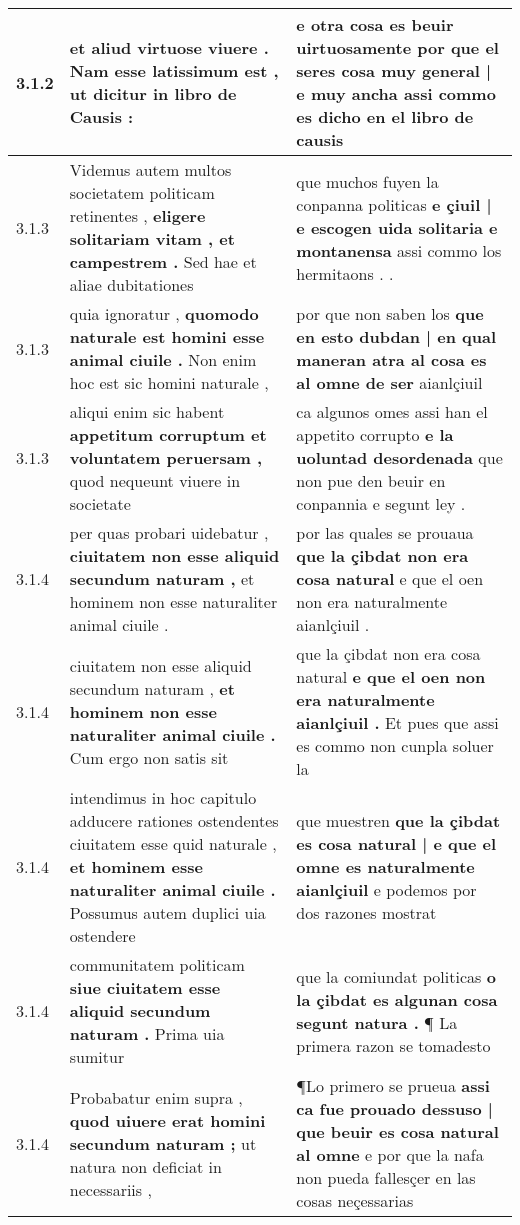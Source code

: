 \begin{tabular}{|p{1cm}|p{6.5cm}|p{6.5cm}|}
3.1.2 & et aliud virtuose viuere . \textbf{ Nam esse latissimum est , } ut dicitur in libro de Causis : & e otra cosa es beuir uirtuosamente \textbf{ por que el seres cosa muy general | e muy ancha } assi commo es dicho en el libro de causis \\\hline
3.1.3 & Videmus autem multos societatem politicam retinentes , \textbf{ eligere solitariam vitam , et campestrem . } Sed hae et aliae dubitationes & que muchos fuyen la conpanna politicas \textbf{ e çiuil | e escogen uida solitaria e montanensa } assi commo los hermitaons . . \\\hline
3.1.3 & quia ignoratur , \textbf{ quomodo naturale est homini esse animal ciuile . } Non enim hoc est sic homini naturale , & por que non saben los \textbf{ que en esto dubdan | en qual maneran atra al cosa es al omne de ser } aianlçiuil \\\hline
3.1.3 & aliqui enim sic habent \textbf{ appetitum corruptum et voluntatem peruersam , } quod nequeunt viuere in societate & ca algunos omes assi han el appetito corrupto \textbf{ e la uoluntad desordenada } que non pue den beuir en conpannia e segunt ley . \\\hline
3.1.4 & per quas probari uidebatur , \textbf{ ciuitatem non esse aliquid secundum naturam , } et hominem non esse naturaliter animal ciuile . & por las quales se prouaua \textbf{ que la çibdat non era cosa natural } e que el oen non era naturalmente aianlçiuil . \\\hline
3.1.4 & ciuitatem non esse aliquid secundum naturam , \textbf{ et hominem non esse naturaliter animal ciuile . } Cum ergo non satis sit & que la çibdat non era cosa natural \textbf{ e que el oen non era naturalmente aianlçiuil . } Et pues que assi es commo non cunpla soluer la \\\hline
3.1.4 & intendimus in hoc capitulo adducere rationes ostendentes ciuitatem esse quid naturale , \textbf{ et hominem esse naturaliter animal ciuile . } Possumus autem duplici uia ostendere & que muestren \textbf{ que la çibdat es cosa natural | e que el omne es naturalmente aianlçiuil } e podemos por dos razones mostrat \\\hline
3.1.4 & communitatem politicam \textbf{ siue ciuitatem esse aliquid secundum naturam . } Prima uia sumitur & que la comiundat politicas \textbf{ o la çibdat es algunan cosa segunt natura . } ¶ La primera razon se tomadesto \\\hline
3.1.4 & Probabatur enim supra , \textbf{ quod uiuere erat homini secundum naturam ; } ut natura non deficiat in necessariis , & ¶Lo primero se prueua \textbf{ assi ca fue prouado dessuso | que beuir es cosa natural al omne } e por que la nafa non pueda fallesçer en las cosas neçessarias \\\hline

\end{tabular}
